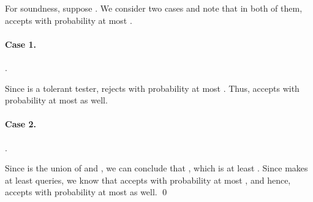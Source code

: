 \documentclass[11pt,english]{article}
\theoremstyle{definition}
\theoremstyle{remark}
\begin{document}
For soundness, suppose . 
We consider two cases and note that in both of them,  accepts  with probability at most .

\paragraph{Case 1.} .

Since  is a tolerant tester,  rejects  with probability at most .
Thus,  accepts with probability at most  as well.
 
\paragraph{Case 2.} .

Since  is the union of  and , we can conclude that 
, which is at least 
. 
Since  makes at least  queries, we know that
 accepts  with probability at most , and
hence,  accepts  with probability at most  as well.
\qed
\end{document}
